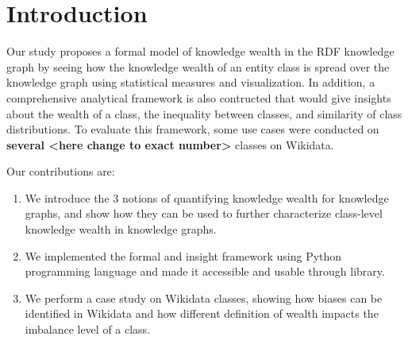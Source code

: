 \section{Introduction}


Our study proposes a formal model of knowledge wealth in the RDF knowledge graph by seeing how the knowledge wealth of an entity class is spread over the knowledge graph using statistical measures and visualization. In addition, a comprehensive analytical framework is also contructed that would give insights about the wealth of a class, the inequality between classes, and similarity of class distributions. To evaluate this framework, some use cases were conducted on \textbf{several <here change to exact number>} classes on Wikidata.

Our contributions are:
\begin{enumerate}
    \item We introduce the 3 notions of quantifying knowledge wealth for knowledge graphs, and show how they can be used to further characterize class-level knowledge wealth in knowledge graphs.
    \item We implemented the formal and insight framework using Python programming language and made it accessible and usable through library.
    \item We perform a case study on Wikidata classes, showing how biases can be identified in Wikidata and how different definition of wealth impacts the imbalance level of a class.
\end{enumerate}